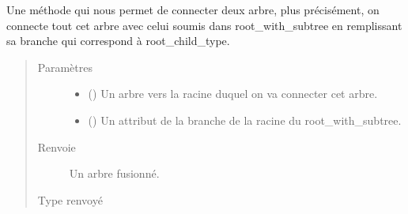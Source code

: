 \documentclass[letterpaper,10pt,french]{sphinxmanual}
\begin{document}
\begin{fulllineitems}
\begin{fulllineitems}
\begin{quote}
\begin{description}
\end{description}\end{quote}

\end{fulllineitems}


\begin{fulllineitems}
\label{\detokenize{index:StrategyTree.StrategyTree.connect}}
Une méthode qui nous permet de connecter deux arbre, plus précisément, on connecte tout cet arbre avec celui
soumis dans root\_with\_subtree en remplissant sa branche qui correspond à root\_child\_type.
\begin{quote}\begin{description}
\item[{Paramètres}] \leavevmode\begin{itemize}
\item {} 
 ({\hyperref[\detokenize{index:StrategyTree.StrategyTree}]{}}) \textendash{} Un arbre vers la racine duquel on va connecter cet arbre.

\item {} 
 () \textendash{} Un attribut de la branche de la racine du root\_with\_subtree.

\end{itemize}

\item[{Renvoie}] \leavevmode
{} \textendash{} Un arbre fusionné.

\item[{Type renvoyé}] \leavevmode
{\hyperref[\detokenize{index:StrategyTree.StrategyTree}]{}}

\end{description}\end{quote}

\end{fulllineitems}



\end{fulllineitems}
\end{document}

